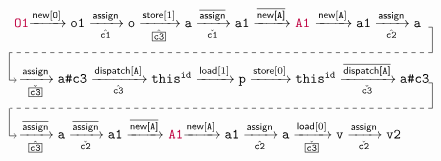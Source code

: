 \begin{equation} 
\label{eq:ex2-inv-c2}
  \centering
\begin{tabular}{l} 
\commentfont{O1}$\xrightarrow{\new[\texttt{O}]} \texttt{o1}
\xrightarrow[\hat{\texttt{c1}}]{\assign} \texttt{o} 
\xrightarrow[\hat{\boxed{\texttt{c3}}}]{\store[1]} \texttt{a} 
\xrightarrow[\check{\texttt{c1}}]{\iassign} \texttt{a1}
\xrightarrow{\inewfield{\texttt{A}}}
$
\commentfont{A1}
$ \xrightarrow{\new[\texttt{A}]} \texttt{a1} 
\xrightarrow[\hat{\texttt{c2}}]{\assign} \texttt{a}$ \\[5ex]
\begin{tikzpicture}[-, remember picture,overlay]
\def\lx{10.4}\def\ly{1.4}
\def\dy{.76}\def\ny{.065}
\draw(\lx, \ly) -- (\lx+.1, \ly) -- (\lx+.1, \dy);
\draw[dashed] (\lx+.1, \dy) -- (-.12,\dy);
\draw(-.12,\dy) -- (-.12, \ny);
\draw[->] (-.12, \ny) -- (0.06, \ny);
\end{tikzpicture}
$\xrightarrow[\check{\boxed{\texttt{c3}}}]{\assign} \texttt{a\#c3}
\xrightarrow[\hat{\texttt{c3}}]{\indispatch[\texttt{A}]} \texttt{this}^{\texttt{id}} 
\xrightarrow{\load[1]} \texttt{p} \xrightarrow{\store[\ret]} \texttt{this}^{\texttt{id}} 
\xrightarrow[\check{\texttt{c3}}]{\iindispatchfield{\texttt{A}}} \texttt{a\#c3}
$ \\[5ex]
\begin{tikzpicture}[-, remember picture,overlay]
\def\lx{10.4}\def\ly{1.4}
\def\dy{.76}\def\ny{.065}
\draw(\lx, \ly) -- (\lx+.1, \ly) -- (\lx+.1, \dy);
\draw[dashed] (\lx+.1, \dy) -- (-.1,\dy);
\draw(-.12,\dy) -- (-.12, \ny);
\draw[->] (-.12, \ny) -- (0.06, \ny);
\end{tikzpicture}
$\xrightarrow[\hat{\boxed{\texttt{c3}}}]{\iassign} \texttt{a}
\xrightarrow[\check{\texttt{c2}}]{\iassign} \texttt{a1} 
\xrightarrow{\inewfield{\texttt{A}}}$
\commentfont{A1}$\xrightarrow{\new[\texttt{A}]} \texttt{a1}
\xrightarrow[\hat{\texttt{c2}}]{\assign} \texttt{a}
\xrightarrow[\check{\boxed{\texttt{c3}}}]{\load[\ret]}
\texttt{v} \xrightarrow[\check{\texttt{c2}}]{\assign} 
\texttt{v2}
$
\end{tabular}
\end{equation}

